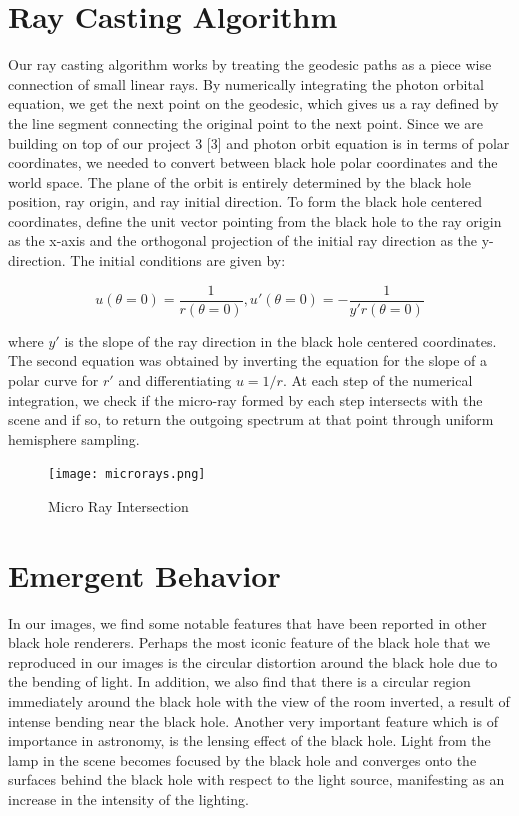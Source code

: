 \documentclass[sigconf]{acmart}
\begin{document}
\section{Ray Casting Algorithm}

Our ray casting algorithm works by treating the geodesic paths as a piece wise connection of small linear rays. By numerically integrating the photon orbital equation, we get the next point on the geodesic, which gives us a ray defined by the line segment connecting the original point to the next point. Since we are building on top of our project 3 [3] and photon orbit equation is in terms of polar coordinates, we needed to convert between black hole polar coordinates and the world space.  The plane of the orbit is entirely determined by the black hole position, ray origin, and ray initial direction.  To form the black hole centered coordinates, define the unit vector pointing from the black hole to the ray origin as the x-axis and the orthogonal projection of the initial ray direction as the y-direction.  The initial conditions are given by:

\begin{displaymath}
  u(\theta = 0) = \frac{1}{r(\theta = 0)},
  u'(\theta = 0) = -\frac{1}{y'r(\theta = 0)}
\end{displaymath}

where $y'$ is the slope of the ray direction in the black hole centered coordinates.  The second equation was obtained by inverting the equation for the slope of a polar curve for $r'$ and differentiating $u = 1/r$. At each step of the numerical integration, we check if the micro-ray formed by each step intersects with the scene and if so, to return the outgoing spectrum at that point through uniform hemisphere sampling.

\begin{figure}[h]
  \centering
  \texttt{[image: microrays.png]}
  \caption{Micro Ray Intersection}
  \Description{}
\end{figure}

\section{Emergent Behavior}

In our images, we find some notable features that have been reported in other black hole renderers. Perhaps the most iconic feature of the black hole that we reproduced in our images is the circular distortion around the black hole due to the bending of light.  In addition, we also find that there is a circular region immediately around the black hole with the view of the room inverted, a result of intense bending near the black hole.  Another very important feature which is of importance in astronomy, is the lensing effect of the black hole.  Light from the lamp in the scene becomes focused by the black hole and converges onto the surfaces behind the black hole with respect to the light source, manifesting as an increase in the intensity of the lighting.
\end{document}
